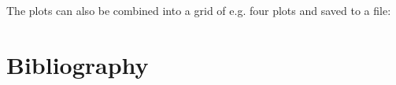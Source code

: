 \documentclass[twoside,a4wide,11pt]{article}\usepackage[]{graphicx}\usepackage[]{color}
\makeatletter
\newenvironment{kframe}{%
 \def\at@end@of@kframe{}%
 \ifinner\ifhmode%
  \def\at@end@of@kframe{\end{minipage}}%
  \begin{minipage}{\columnwidth}%
 \fi\fi%
 \def\FrameCommand##1{\hskip\@totalleftmargin \hskip-\fboxsep
 \colorbox{shadecolor}{##1}\hskip-\fboxsep
     \hskip-\linewidth \hskip-\@totalleftmargin \hskip\columnwidth}%
 \MakeFramed {\advance\hsize-\width
   \@totalleftmargin\z@ \linewidth\hsize
   \@setminipage}}%
 {\par\unskip\endMakeFramed%
 \at@end@of@kframe}
\newenvironment{knitrout}{}{} %
\makeatother
\begin{document}
The plots can also be combined into a grid of e.g. four plots and saved to a file:
\begin{knitrout}
\color{fgcolor}\begin{kframe}


{\ttfamily\noindent\bfseries\color{errorcolor}{\#\# Error in arrangeGrob(...): object 'plot\_chr3' not found}}\end{kframe}
\end{knitrout}


\section{Bibliography}
\printbibliography
\end{document}
